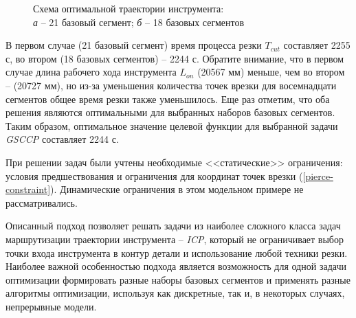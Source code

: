 \begin{figure}[H]
  \centering
  \caption{
    Схема оптимальной траектории инструмента: \\
    {\it а} -- 21 базовый сегмент;
    {\it б} -- 18 базовых сегментов
  }
  \label{gsccp.paths}
\end{figure}

В первом случае
(21 базовый сегмент)
время процесса резки
$T_{cut}$
составляет 2255 с,
во втором
(18 базовых сегментов)
-- 2244 с.
Обратите внимание, что в первом случае длина рабочего хода инструмента
$L_{on}$
(20567 мм) меньше, чем во втором -- (20727 мм),
но из-за уменьшения количества точек врезки
для восемнадцати сегментов общее время резки также уменьшилось.
Еще раз отметим, что оба решения являются оптимальными
для выбранных наборов базовых сегментов.
Таким образом, оптимальное значение целевой
функции для выбранной задачи {\it GSCCP} составляет 2244 с.

При решении задач были учтены необходимые <<статические>> ограничения:
условия предшествования и ограничения для координат
точек врезки (\ref{pierce-constraint}).
Динамические ограничения в этом модельном примере не рассматривались.

Описанный подход позволяет решать задачи из
наиболее сложного класса задач маршрутизации
траектории инструмента -- {\it ICP},
который не ограничивает выбор точки входа
инструмента в контур детали и использование
любой техники резки.
Наиболее важной особенностью подхода
является возможность для одной задачи оптимизации
формировать разные наборы базовых сегментов и
применять разные алгоритмы оптимизации,
используя как дискретные, так и,
в некоторых случаях, непрерывные модели.
